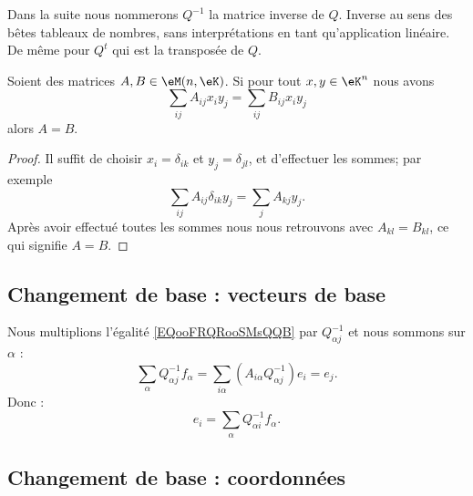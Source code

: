 Dans la suite nous nommerons \( Q^{-1}\) la matrice inverse de \( Q\). Inverse au sens des bêtes tableaux de nombres, sans interprétations en tant qu'application linéaire. De même pour \( Q^t\) qui est la transposée de \( Q\).

\begin{lemma}       \label{LEMooLXAHooPRyHaF}
    Soient des matrices \( A,B\in \eM(n,\eK)\). Si pour tout \( x,y\in \eK^n\) nous avons
    \begin{equation}
        \sum_{ij}A_{ij}x_iy_j=\sum_{ij}B_{ij}x_iy_j
    \end{equation}
    alors \( A=B\).
\end{lemma}

\begin{proof}
    Il suffit de choisir \( x_i=\delta_{ik}\) et \( y_j=\delta_{jl}\), et d'effectuer les sommes; par exemple
    \begin{equation}
        \sum_{ij}A_{ij}\delta_{ik}y_j=\sum_jA_{kj}y_j.
    \end{equation}
    Après avoir effectué toutes les sommes nous nous retrouvons avec \( A_{kl}=B_{kl}\), ce qui signifie \( A=B\).
\end{proof}

\subsection{Changement de base : vecteurs de base}

Nous multiplions l'égalité \eqref{EQooFRQRooSMsQQB} par \( Q^{-1}_{\alpha j}\) et nous sommons sur \( \alpha\) :
\begin{equation}
    \sum_{\alpha}Q^{-1}_{\alpha j}f_{\alpha}=\sum_{i\alpha}(A_{i\alpha}Q^{-1}_{\alpha j})e_i=e_j.
\end{equation}
Donc :
\begin{equation}    \label{EQooZQPAooAbKAdg}
    e_i=\sum_{\alpha}Q^{-1}_{\alpha i}f_{\alpha}.
\end{equation}

\subsection{Changement de base : coordonnées}

